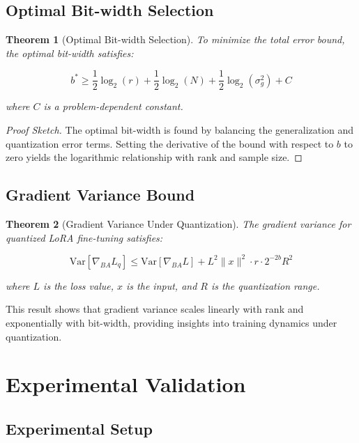 \documentclass[10pt,twocolumn]{article}
\newcommand{\Var}{\text{Var}}
\newtheorem{theorem}{Theorem}[section]
\begin{document}
\subsection{Optimal Bit-width Selection}

\begin{theorem}[Optimal Bit-width Selection]
\label{thm:optimal_bits}
To minimize the total error bound, the optimal bit-width satisfies:

\begin{equation}
b^* \geq \frac{1}{2}\log_2(r) + \frac{1}{2}\log_2(N) + \frac{1}{2}\log_2(\sigma_g^2) + C
\end{equation}

where $C$ is a problem-dependent constant.
\end{theorem}

\begin{proof}[Proof Sketch]
The optimal bit-width is found by balancing the generalization and quantization error terms. Setting the derivative of the bound with respect to $b$ to zero yields the logarithmic relationship with rank and sample size.
\end{proof}

\subsection{Gradient Variance Bound}

\begin{theorem}[Gradient Variance Under Quantization]
\label{thm:gradient_variance}
The gradient variance for quantized LoRA fine-tuning satisfies:

\begin{equation}
\Var[\nabla_{BA} L_q] \leq \Var[\nabla_{BA} L] + L^2 \|x\|^2 \cdot r \cdot 2^{-2b} R^2
\end{equation}

where $L$ is the loss value, $x$ is the input, and $R$ is the quantization range.
\end{theorem}

This result shows that gradient variance scales linearly with rank and exponentially with bit-width, providing insights into training dynamics under quantization.

\section{Experimental Validation}

\subsection{Experimental Setup}
\end{document}
